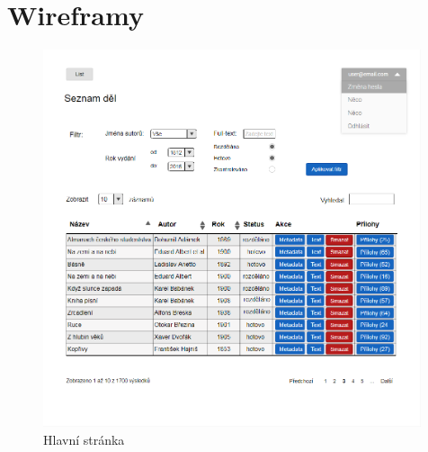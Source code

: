 \documentclass[thesis=B,czech]{FITthesis}[2012/06/26]
\begin{document}
    


    







\begin{conclusion}

\end{conclusion}




\appendix

\chapter{Wireframy}

    \begin {figure}[H]\centering
        \includegraphics[width=0.991\textwidth]{images/main}
        \caption {Hlavní stránka}
        \label {fig:main}
    \end{figure}
\end{document}
